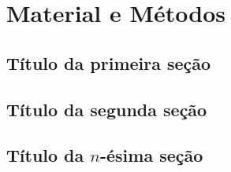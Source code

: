 \chapter{Material e Métodos}
\label{chapter:tema2}
\lipsum[1]

\section{T\'itulo da primeira se\c{c}\~ao}
\label{section:titulo31}
\lipsum[4]

\section{T\'itulo da segunda se\c{c}\~ao}
\label{section:titulo32}
\lipsum[2]

\section{T\'itulo da $n$-\'esima se\c{c}\~ao}
\label{section:titulo3N}
\lipsum[3]